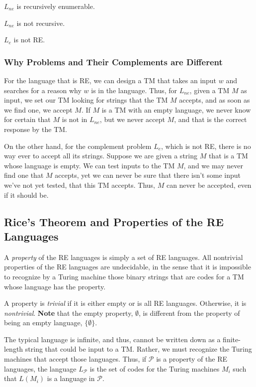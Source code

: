 \documentclass[]{article}
\begin{document}
\begin{thm}
$L_{ne}$ is recursively enumerable.
\end{thm}

\begin{thm}
$L_{ne}$ is not recursive.
\end{thm}

\begin{thm}
$L_e$ is not RE.
\end{thm}

\subsubsection*{Why Problems and Their Complements are Different}
For the language that is RE, we can design a TM that takes an input $w$ and
searches for a reason why $w$ is in the language. Thus, for $L_{ne}$, given a TM
$M$ as input, we set our TM looking for strings that the TM $M$ accepts, and as
soon as we find one, we accept $M$. If $M$ is a TM with an empty language, we
never know for certain that $M$ is not in $L_{ne}$, but we never accept $M$, and
that is the correct response by the TM.

On the other hand, for the complement problem $L_e$, which is not RE, there is
no way ever to accept all its strings. Suppose we are given a string $M$ that is
a TM whose language is empty. We can test inputs to the TM $M$, and we may never
find one that $M$ accepts, yet we can never be sure that there isn't some input
we've not yet tested, that this TM accepts. Thus, $M$ can never be accepted,
even if it should be.

\subsection*{Rice's Theorem and Properties of the RE Languages}
A \emph{property} of the RE languages is simply a set of RE languages. All
nontrivial properties of the RE languages are undecidable, in the sense that it
is impossible to recognize by a Turing machine those binary strings that are
codes for a TM whose language has the property.

A property is \emph{trivial} if it is either empty or is all RE languages.
Otherwise, it is \emph{nontrivial}. \textbf{Note} that the empty property,
$\emptyset$, is different from the property of being an empty language,
$\{\emptyset\}$.

The typical language is infinite, and thus, cannot be written down as a finite-
length string that could be input to a TM. Rather, we must recognize the Turing
machines that accept those languages. Thus, if $\mathcal{P}$ is a property of
the RE languages, the language $L_{\mathcal{P}}$ is the set of codes for the
Turing machines $M_i$ such that $L(M_i)$ is a language in $\mathcal{P}$.
\end{document}
